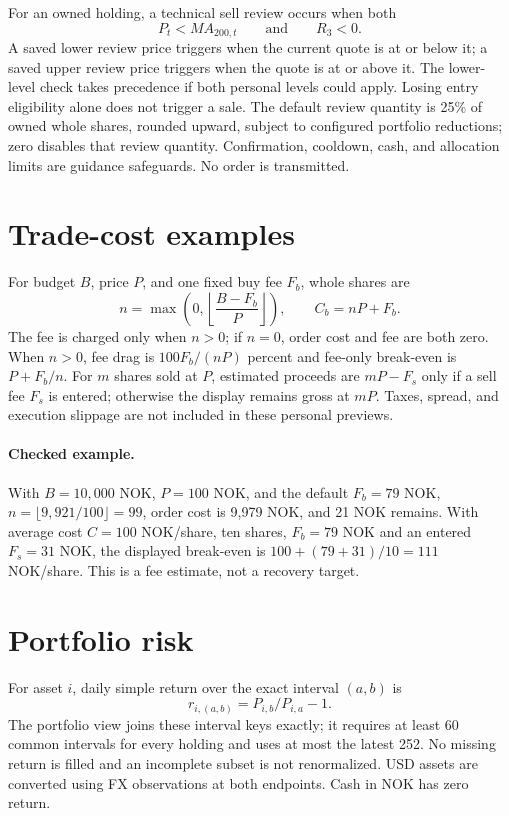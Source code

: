 \documentclass[11pt]{article}
\begin{document}
For an owned holding, a technical sell review occurs when both
\[
P_t<MA_{200,t}\qquad\text{and}\qquad R_3<0.
\]
A saved lower review price triggers when the current quote is at or below it;
a saved upper review price triggers when the quote is at or above it. The
lower-level check takes precedence if both personal levels could apply.
Losing entry eligibility alone does not trigger a sale. The default review
quantity is 25\% of owned whole shares, rounded upward, subject to configured
portfolio reductions; zero disables that review quantity. Confirmation,
cooldown, cash, and allocation limits are guidance safeguards. No order is
transmitted.

\section{Trade-cost examples}

For budget $B$, price $P$, and one fixed buy fee $F_b$, whole shares are
\[
n=\max\left(0,\left\lfloor\frac{B-F_b}{P}\right\rfloor\right),
\qquad C_b=nP+F_b.
\]
The fee is charged only when $n>0$; if $n=0$, order cost and fee are both
zero. When $n>0$, fee drag is $100F_b/(nP)$ percent and fee-only break-even is
$P+F_b/n$. For $m$ shares sold at $P$, estimated proceeds are $mP-F_s$ only
if a sell fee $F_s$ is entered; otherwise the display remains gross at $mP$.
Taxes, spread, and execution slippage are not included in these personal
previews.

\paragraph{Checked example.} With $B=10{,}000$ NOK, $P=100$ NOK, and the
default $F_b=79$ NOK, $n=\lfloor9{,}921/100\rfloor=99$, order cost is
9{,}979 NOK, and 21 NOK remains. With average cost $C=100$ NOK/share, ten
shares, $F_b=79$ NOK and an entered $F_s=31$ NOK, the displayed break-even is
$100+(79+31)/10=111$ NOK/share. This is a fee estimate, not a recovery target.

\section{Portfolio risk}

For asset $i$, daily simple return over the exact interval $(a,b)$ is
\[
r_{i,(a,b)}=P_{i,b}/P_{i,a}-1.
\]
The portfolio view joins these interval keys exactly; it requires at least 60
common intervals for every holding and uses at most the latest 252. No missing
return is filled and an incomplete subset is not renormalized. USD assets are
converted using FX observations at both endpoints. Cash in NOK has zero return.
\end{document}
